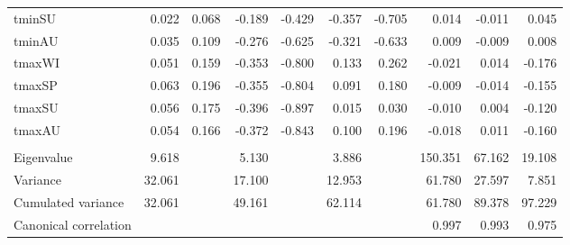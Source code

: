 \begin{table}[]
\begin{table}[H]
{\begin{tabular}{lrrrrrrrrr}
\hspace{1em}tminSU & 0.022 & 0.068 & -0.189 & -0.429 & -0.357 & -0.705 & 0.014 & -0.011 & 0.045\\
\hspace{1em}tminAU & 0.035 & 0.109 & -0.276 & -0.625 & -0.321 & -0.633 & 0.009 & -0.009 & 0.008\\
\hspace{1em}tmaxWI & 0.051 & 0.159 & -0.353 & -0.800 & 0.133 & 0.262 & -0.021 & 0.014 & -0.176\\
\hspace{1em}tmaxSP & 0.063 & 0.196 & -0.355 & -0.804 & 0.091 & 0.180 & -0.009 & -0.014 & -0.155\\
\hspace{1em}tmaxSU & 0.056 & 0.175 & -0.396 & -0.897 & 0.015 & 0.030 & -0.010 & 0.004 & -0.120\\
\hspace{1em}tmaxAU & 0.054 & 0.166 & -0.372 & -0.843 & 0.100 & 0.196 & -0.018 & 0.011 & -0.160\\
\addlinespace[0.3em]
\multicolumn{10}{l}{\textbf{}}\\
\hspace{1em}Eigenvalue & 9.618 &  & 5.130 &  & 3.886 &  & 150.351 & 67.162 & 19.108\\
\hspace{1em}Variance & 32.061 &  & 17.100 &  & 12.953 &  & 61.780 & 27.597 & 7.851\\
\hspace{1em}Cumulated variance & 32.061 &  & 49.161 &  & 62.114 &  & 61.780 & 89.378 & 97.229\\
\hspace{1em}Canonical correlation &  &  &  &  &  &  & 0.997 & 0.993 & 0.975\\
\bottomrule
\end{tabular}}
\end{table}
\label{tab:tpca}
\end{table}

